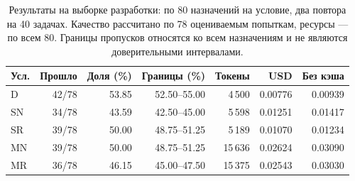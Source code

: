 \begin{table}[htbp]\centering\small
\caption{Результаты на выборке разработки: по 80 назначений на условие, два повтора на 40 задачах. Качество рассчитано по 78 оцениваемым попыткам, ресурсы --- по всем 80. Границы пропусков относятся ко всем назначениям и не являются доверительными интервалами.}\label{tab:dev40-main}
\begin{tabular}{lrrrrrr}\toprule
Усл. & Прошло & Доля (\%) & Границы (\%) & Токены & USD & Без кэша\\
\midrule
D & 42/78 & 53.85 & 52.50--55.00 & 4\,500 & 0.00776 & 0.00939\\
SN & 34/78 & 43.59 & 42.50--45.00 & 5\,598 & 0.01251 & 0.01417\\
SR & 39/78 & 50.00 & 48.75--51.25 & 5\,189 & 0.01070 & 0.01234\\
MN & 39/78 & 50.00 & 48.75--51.25 & 15\,636 & 0.02624 & 0.03090\\
MR & 36/78 & 46.15 & 45.00--47.50 & 15\,375 & 0.02543 & 0.03030\\
\bottomrule\end{tabular}\end{table}
